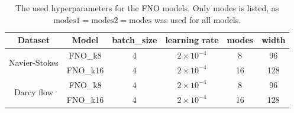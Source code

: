 \begin{table}[]
\centering
\begin{tabular}{|c|c|c|c|c|c|}
\hline
Dataset                        & Model    & batch\_size & learning rate    & modes & width \\
\hline
\multirow{2}{*}{Navier-Stokes} & FNO\_k8  & 4           & $2\times10^{-4}$ & 8     & 96    \\
                               & FNO\_k16 & 4           & $2\times10^{-4}$ & 16    & 128   \\
\hline
\multirow{2}{*}{Darcy flow}    & FNO\_k8  & 4           & $2\times10^{-4}$ & 8     & 96    \\
                               & FNO\_k16 & 4           & $2\times10^{-4}$ & 16    & 128   \\
\hline
\end{tabular}
\caption{The used hyperparameters for the FNO models. Only modes is listed, as $\mathrm{modes1} = \mathrm{modes2} = \mathrm{modes}$ was used for all models.}
\label{tab:fno-hyperparameters}
\end{table}

\begin{table}[]
\centering
{}
\caption{The used hyperparameters for the CNO models.}
\label{tab:cno-hyperparameters}
\end{table}


